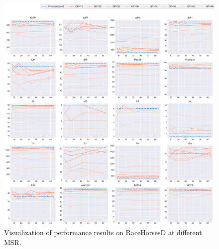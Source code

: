 \begin{figure}[!htbp]
\centering
\includegraphics[width=1.0\linewidth]{img/appendix/RaceHorsesD_all_multiplots_msr.pdf}
\caption[Visualization of performance results on RaceHorsesD at different MSR]
{Visualization of performance results on RaceHorsesD at different MSR.}
\label{fig:RaceHorsesD_all_msr}
\end{figure}



